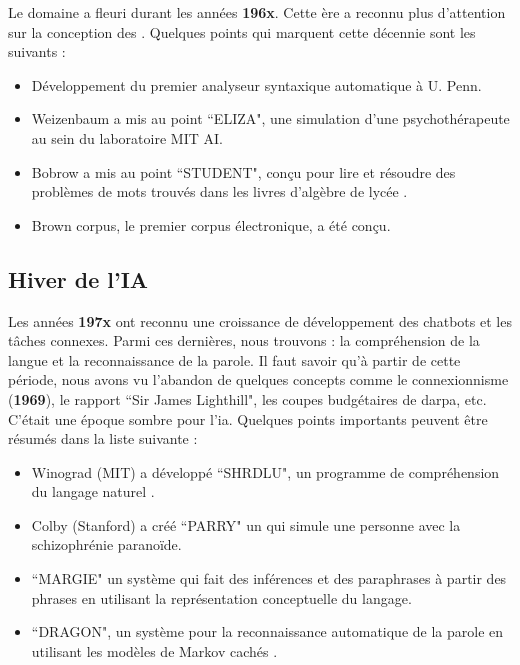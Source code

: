 \documentclass{KodeBook}
\begin{document}
Le domaine a fleuri durant les années \textbf{196x}.
Cette ère a reconnu plus d'attention sur la conception des . 
Quelques points qui marquent cette décennie sont les suivants :
\begin{itemize}
	\item {} Développement du premier analyseur syntaxique automatique à U. Penn. \cite{1961-joshi,1962-harris} 
	\item {} Weizenbaum a mis au point ``ELIZA", une simulation d'une psychothérapeute au sein du laboratoire MIT AI.
	\item {} Bobrow a mis au point ``STUDENT", conçu pour lire et résoudre des problèmes de mots trouvés dans les livres d'algèbre de lycée \cite{1964-bobrow}.
	\item {} Brown corpus, le premier corpus électronique, a été conçu.
\end{itemize}

\subsection{Hiver de l'IA}

Les années \textbf{197x} ont reconnu une croissance de développement des chatbots et les tâches connexes. 
Parmi ces dernières, nous trouvons : la compréhension de la langue et la reconnaissance  de la parole. 
Il faut savoir qu'à partir de cette période, nous avons vu l'abandon de quelques concepts comme le connexionnisme (\textbf{1969}), le rapport ``Sir James Lighthill", les coupes budgétaires de \ac{darpa}, etc. 
C'était une époque sombre pour l'\ac{ia}.
Quelques points importants peuvent être résumés dans la liste suivante :
\begin{itemize}
	\item {} Winograd (MIT) a développé ``SHRDLU", un programme de compréhension du langage naturel \cite{1971-winograd}.
	\item {} Colby (Stanford) a créé ``PARRY" un  qui simule une personne avec la schizophrénie paranoïde.
	\item {} ``MARGIE" un système qui fait des inférences et des paraphrases à partir des phrases en utilisant la représentation conceptuelle du langage. 
	\item {} ``DRAGON", un système pour la reconnaissance automatique de la parole en utilisant les modèles de Markov cachés \cite{1975-baker}.
\end{itemize}
\end{document}
